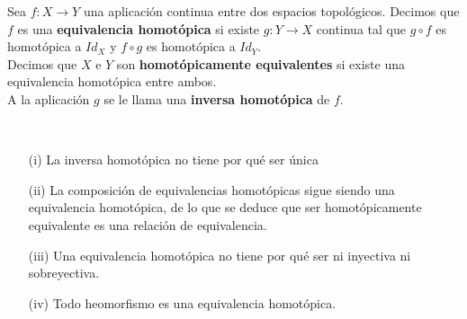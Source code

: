 \begin{definicion}
    Sea $f:X\to Y$ una aplicación continua entre dos espacios topológicos. Decimos que $f$ es una \textbf{equivalencia homotópica} si existe $g:Y\to X$ continua tal que $g\circ f$ es homotópica a $Id_X$ y $f\circ g$ es homotópica a $Id_Y$.\\

    Decimos que $X$ e $Y$ son \textbf{homotópicamente equivalentes} si existe una equivalencia homotópica entre ambos.\\

    A la aplicación $g$ se le llama una \textbf{inversa homotópica} de $f$.
\end{definicion}

\begin{observacion}\
    \begin{enumerate}
        \item[(i)] La inversa homotópica no tiene por qué ser única
        \item[(ii)] La composición de equivalencias homotópicas sigue siendo una equivalencia homotópica, de lo que se deduce que ser homotópicamente equivalente es una relación de equivalencia.
        \item[(iii)] Una equivalencia homotópica no tiene por qué ser ni inyectiva ni sobreyectiva. 
        \item[(iv)] Todo heomorfismo es una equivalencia homotópica.
    \end{enumerate}
\end{observacion}


